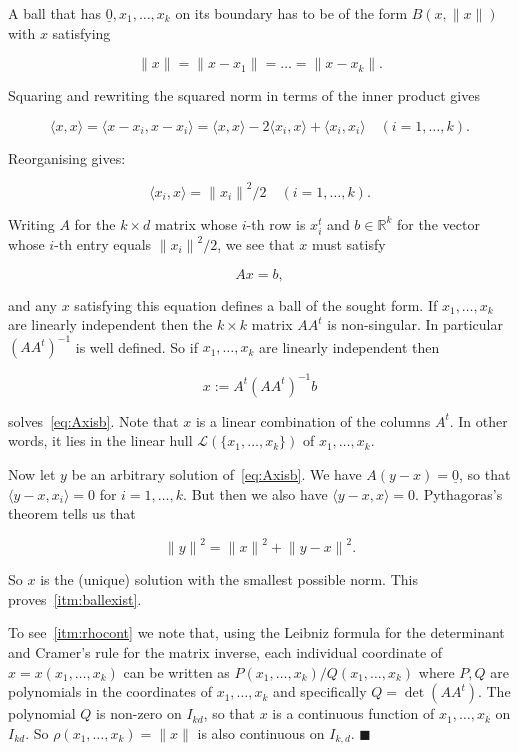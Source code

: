 \documentclass[11pt]{article}%
\newenvironment{proof}{\vspace{1ex}\noindent{\bf Proof.}}{\hspace*{\fill}$\blacksquare$\vspace{1ex}}
\newcommand{\Lcal}[0]{\ensuremath{{\mathcal L}}}
\newcommand{\eR}[0]{\ensuremath{ \mathbb R}}
\newcommand{\norm}[1]{\ensuremath{\|#1\|}}
\newcommand{\orig}{\underline{0}}
\begin{document}
\begin{proof}
A ball that has $\orig, x_1,\dots,x_k$ on its boundary has to be of the form $B(x,\norm{x})$ with $x$ satisfying

$$ \norm{x} = \norm{x-x_1} = \dots = \norm{x-x_k}. $$

\noindent
Squaring and rewriting the squared norm in terms of the inner product gives

$$ \langle x,x\rangle =  \langle x-x_i,x-x_i\rangle = 
\langle x,x\rangle - 2\langle x_i,x\rangle + \langle x_i,x_i\rangle \quad (i=1,\dots,k). $$

\noindent 
Reorganising gives:

$$ \langle x_i,x \rangle = \norm{x_i}^2/2 \quad (i=1,\dots,k). $$

\noindent
Writing $A$ for the $k\times d$ matrix whose $i$-th row is $x_i^t$ and $b \in \eR^k$ for the 
vector whose $i$-th entry equals $\norm{x_i}^2/2$, we see that $x$ must satisfy

\begin{equation}\label{eq:Axisb} 
A x = b,  
\end{equation}

 
\noindent
and any $x$ satisfying this equation defines a ball of the sought form.
If $x_1,\dots,x_k$ are linearly independent then the $k\times k$ matrix $A A^t$ is non-singular. 
In particular $(A A^t)^{-1}$ is well defined. So if $x_1,\dots,x_k$ are linearly independent then

\begin{equation}\label{eq:xsol} 
x := A^t(AA^t)^{-1} b
\end{equation}

\noindent 
solves~\eqref{eq:Axisb}.
Note that $x$ is a linear combination of the columns $A^t$. 
In other words, it lies in the linear hull $\Lcal(\{x_1,\dots,x_k\})$ of $x_1,\dots,x_k$. 

Now let $y$ be an arbitrary solution of~\eqref{eq:Axisb}.
We have $A (y-x) = \orig$, so that $\langle y-x, x_i\rangle = 0$ for $i=1,\dots, k$.
But then we also have $\langle y-x,x\rangle = 0$.
Pythagoras's theorem tells us that

$$ \norm{y}^2 = \norm{x}^2 + \norm{y-x}^2. $$

\noindent
So $x$ is the (unique) solution with the smallest possible norm. This proves~\ref{itm:ballexist}.

To see~\ref{itm:rhocont} we note that, using the Leibniz formula for the determinant 
and Cramer's rule for the matrix inverse, each individual coordinate of $x = x(x_1,\dots,x_k)$
can be written as $P(x_1,\dots,x_k)/Q(x_1,\dots,x_k)$ where $P,Q$ are polynomials in the 
coordinates of $x_1,\dots,x_k$ and specifically $Q = \det(AA^t)$.
The polynomial $Q$ is non-zero on $I_{kd}$, so that $x$ is a continuous function of $x_1,\dots,x_k$ on $I_{kd}$.
So $\rho(x_1,\dots,x_k)
= \norm{x}$ is also continuous on $I_{k,d}$.
\end{proof}
\end{document}
